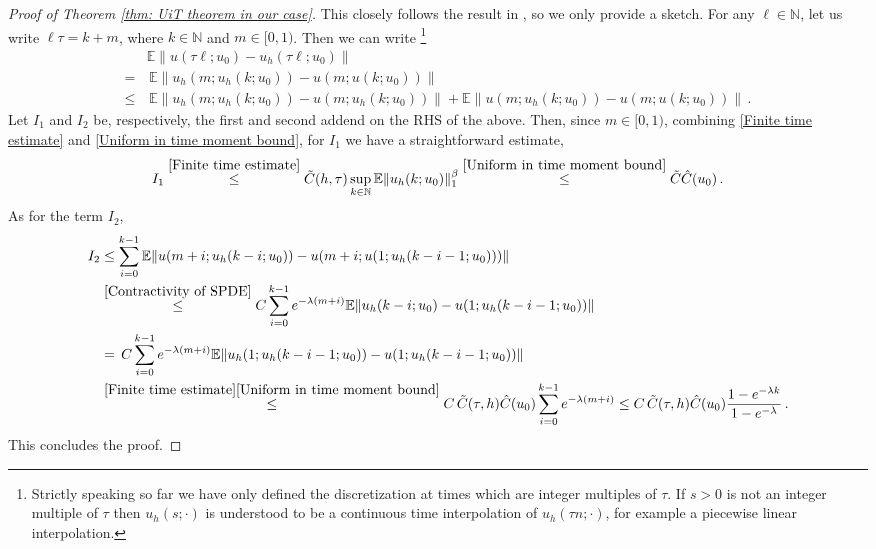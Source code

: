 \documentclass[reqno, 11pt]{amsart}
\theoremstyle{plain}
\theoremstyle{definition}
\theoremstyle{remark}
\numberwithin{equation}{section}
\numberwithin{theorem}{section}
\newcommand{\N}{\mathbb{N}}
\begin{document}
{\begin{proof}[Proof of Theorem \ref{thm: UiT theorem in our case}] This closely follows the result in \cite[Proof of Theorem 3.1]{schuh2024conditions}, so we only provide a sketch.  For any $\ell \in \N$,  let us  write $\ell \tau = k+m$, where $k \in \N$ and $m \in [0,1)$.   Then we can write \footnote{Strictly speaking so far we have only defined the discretization at times which are integer multiples of $\tau$. If $s> 0$ is not an integer multiple of $\tau$ then $u_h(s; \cdot)$ is understood to be a continuous time interpolation of $u_h(\tau n; \cdot)$, for example a piecewise linear interpolation. }
\begin{align*}
& \mathbb E \|u(\tau \ell;u_0) - u_h(\tau \ell; u_0)\| \\
= & \, \mathbb E \|u_h(m;u_h(k;u_0)) - u(m;u(k;u_0))\|\\
 \leq &  \, 
 \mathbb E  \| 
 u_h(m;u_h(k;u_0)) - 
 u(m; u_h(k;u_0))
 \| + \mathbb E \| u(m; u_h(k;u_0)) - u(m;u(k;u_0))
 \| \,.
\end{align*}
Let $I_1$ and $I_2$ be, respectively, the first and second addend on the RHS of the above.  Then, since $m \in [0,1)$, combining \ref{Finite time estimate} and \ref{Uniform in time moment bound}, for $I_1$ we have a straightforward estimate, 
$$
I_1 \stackrel{ \ref{Finite time estimate}}{\leq} \tilde{C}(h, \tau) \sup_{k \in \N} 
\mathbb E \|u_h(k; u_0)\|_1^{\beta} \stackrel{\ref{Uniform in time moment bound}}{\leq} \tilde C \hat C(u_0) \,. 
$$
As for the term $I_2$, 
\begin{align*}
I_2 & \leq \sum_{i=0}^{k-1} \mathbb E \|u(m+i; u_h(k-i;u_0)) - 
u(m+i; u(1;u_h(k-i-1;u_0))) \|\\
& \stackrel{\ref{Contractivity of SPDE}}{\leq}
C \sum_{i=0}^{k-1}  e^{-\lambda (m+i)} 
\mathbb E \| u_h (k-i;u_0) - 
u(1; u_h(k-i-1;u_0))\|\\
& = \,  C \sum_{i=0}^{k-1}  e^{-\lambda (m+i)} \mathbb E
\|u_h(1;u_h(k-i-1;u_0)) - u(1;u_h(k-i-1;u_0))\|\\
& \stackrel{\ref{Finite time estimate}\ref{Uniform in time moment bound}}{\leq} 
C \, \tilde{C}(\tau, h) \hat C(u_0)  \sum_{i=0}^{k-1}  e^{-\lambda (m+i)} \leq 
C \, \tilde{C}(\tau, h) \hat C(u_0)   \frac{1-e^{-\lambda k}}{1-e^{-\lambda}}  \,.
\end{align*}
This concludes the proof. 
\end{proof}


}
\end{document}

